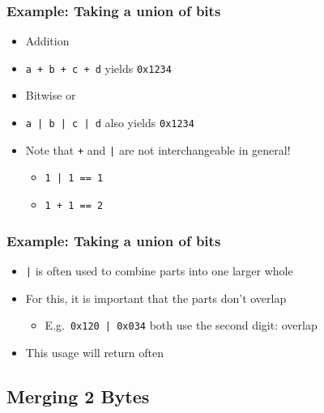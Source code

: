 \begin{frame}
  \frametitle{Example: Taking a union of bits}
  \begin{itemize}
    \item Addition
    \item \texttt{a + b + c + d} yields \texttt{0x1234}
  \end{itemize}
  \vskip4mm
  \begin{itemize}
    \item Bitwise or
    \item \texttt{a | b | c | d} also yields \texttt{0x1234}
  \end{itemize}
  \vskip4mm
  \begin{itemize}
    \item Note that \texttt{+} and \texttt{|} are not interchangeable in general!
          \begin{itemize}
            \item \texttt{1 | 1 == 1}
            \item \texttt{1 + 1 == 2}
          \end{itemize}
  \end{itemize}
\end{frame}

\begin{frame}
  \frametitle{Example: Taking a union of bits}
  \begin{itemize}
    \item \texttt{|} is often used to combine parts into one larger whole
    \item For this, it is important that the parts don't overlap
          \begin{itemize}
            \item E.g.~\texttt{0x120 | 0x034} both use the second digit: overlap
          \end{itemize}
    \item This usage will return often
  \end{itemize}
\end{frame}

\subsection{Merging 2 Bytes}
\frame{\tableofcontents[currentsubsection]}


